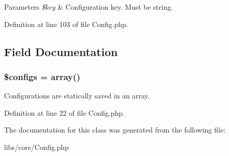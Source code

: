 \begin{DoxyParams}{\-Parameters}
{\em \$key} & \-Configuration key. \-Must be string. \\
\hline
\end{DoxyParams}


\-Definition at line 103 of file \-Config.\-php.



\subsection{\-Field \-Documentation}
\hypertarget{class_config_a95691168d68a876ecc24c7dad14ef24e}{
\subsubsection[{\$configs}]{\setlength{\rightskip}{0pt plus 5cm}\$configs = array()}}\label{class_config_a95691168d68a876ecc24c7dad14ef24e}
\-Configurations are statically saved in an array. 

\-Definition at line 22 of file \-Config.\-php.



\-The documentation for this class was generated from the following file\-:\begin{DoxyCompactItemize}
\item 
libs/core/\-Config.\-php\end{DoxyCompactItemize}
